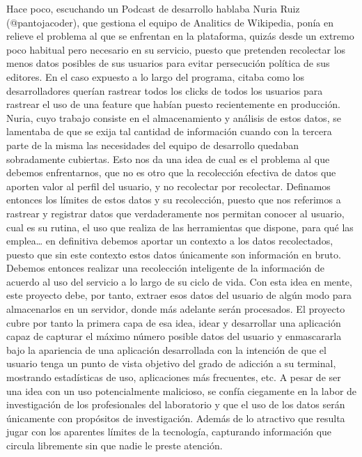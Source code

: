 \documentclass[12pt,a4paper,oneside]{book} %
\begin{document}
\newline \newline
Hace poco, escuchando un Podcast de desarrollo hablaba Nuria Ruiz (@pantojacoder), que gestiona el equipo de Analitics de Wikipedia, ponía en relieve el problema al que se enfrentan en la plataforma, quizás desde un extremo poco habitual pero necesario en su servicio, puesto que pretenden recolectar los menos datos posibles de sus usuarios para evitar persecución política de sus editores. En el caso expuesto a lo largo del programa, citaba como los desarrolladores querían rastrear todos los clicks de todos los usuarios para rastrear el uso de una feature que habían puesto recientemente en producción. 
\newline \newline
Nuria, cuyo trabajo consiste en el almacenamiento y análisis de estos datos, se lamentaba de que se exija tal cantidad de información cuando con la tercera parte de la misma las necesidades del equipo de desarrollo quedaban sobradamente cubiertas. 
Esto nos da una idea de cual es el problema al que debemos enfrentarnos, que no es otro que la recolección efectiva de datos que aporten valor al perfil del usuario, y no recolectar por recolectar. 
\newline \newline
Definamos entonces los límites de estos datos y su recolección, puesto que nos referimos a rastrear y registrar datos que verdaderamente nos permitan conocer al usuario, cual es su rutina, el uso que realiza de las herramientas que dispone, para qué las emplea… en definitiva debemos aportar un contexto a los datos recolectados, puesto que sin este contexto estos datos únicamente son información en bruto. Debemos entonces realizar una recolección inteligente de la información de acuerdo al uso del servicio a lo largo de su ciclo de vida. 
\newline \newline
Con esta idea en mente, este proyecto debe, por tanto, extraer esos datos del usuario de algún modo para almacenarlos en un servidor, donde más adelante serán procesados. El proyecto cubre por tanto la primera capa de esa idea, idear y desarrollar una aplicación capaz de capturar el máximo número posible datos del usuario y enmascararla bajo la apariencia de una aplicación desarrollada con la intención de que el usuario tenga un punto de vista objetivo del grado de adicción a su terminal, mostrando estadísticas de uso, aplicaciones más frecuentes, etc. 
\newline \newline
A pesar de ser una idea con un uso potencialmente malicioso, se confía ciegamente en la labor de investigación de los profesionales del laboratorio y que el uso de los datos serán únicamente con propósitos de investigación. Además de lo atractivo que resulta jugar con los aparentes límites de la tecnología, capturando información que circula libremente sin que nadie le preste atención. 
\end{document}
